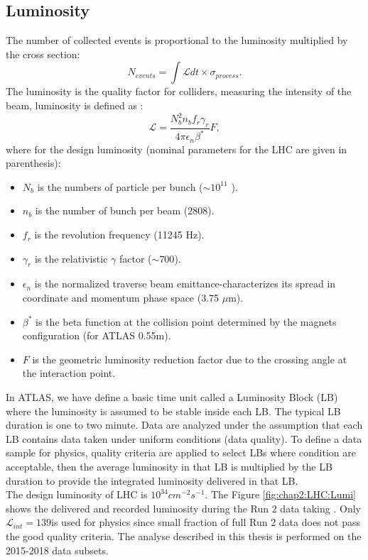 \subsection{Luminosity}
\label{chap2:LHC:Lumi}
The number of collected events is proportional to the luminosity multiplied by the cross section: 
\begin{equation}
N_{events} = \int\mathcal{L} dt \times \sigma_{process}.
\end{equation}
The luminosity is the quality factor for colliders, measuring the intensity of the beam, luminosity is defined as :
\begin{equation}
\mathcal{L} = \frac{N_b^2n_bf_r\gamma_r}{4\pi\epsilon_n\beta^*}F,
\end{equation}
where for the design luminosity (nominal parameters for the LHC are given in parenthesis):
\begin{itemize}
	\item $N_b$ is the numbers of particle per bunch ($\sim10^{11}$ ).
	\item $n_b$ is the number of bunch per beam (2808).
	\item $f_r$ is the revolution frequency (11245 Hz).
	\item $\gamma_r$ is the relativistic $\gamma$ factor ($\sim 700$).
	\item $\epsilon_n$ is the normalized traverse beam emittance-characterizes its spread in coordinate and momentum phase space (3.75 $\mu$m).
	\item $\beta^*$ is the beta function at the collision point determined by the magnets configuration (for ATLAS 0.55m).
	\item $F$ is the geometric luminosity reduction factor due to the crossing angle at the interaction point.
\end{itemize}
In ATLAS, we have define a basic time unit called a Luminosity Block (LB) where the luminosity is assumed to be stable inside each LB. The typical LB duration is one to two minute. Data are analyzed under the assumption that each LB contains data taken under uniform conditions (data quality). To define a data sample for physics, quality criteria are applied to select LBs where condition are acceptable, then the average luminosity in that LB is multiplied by the LB duration to provide the integrated luminosity delivered in that LB. \\
The design luminosity of LHC is $10^{34} cm^{-2}s^{-1}$. The Figure \ref{fig:chap2:LHC:Lumi} shows the delivered and recorded luminosity during the Run 2 data taking \cite{Lumi2018}. Only $\mathcal{L}_{int} = 139$\ifb is used for physics since small fraction of full Run 2 data does not pass the good quality criteria. The analyse described in this thesis is performed on the 2015-2018 data subsets.\\
